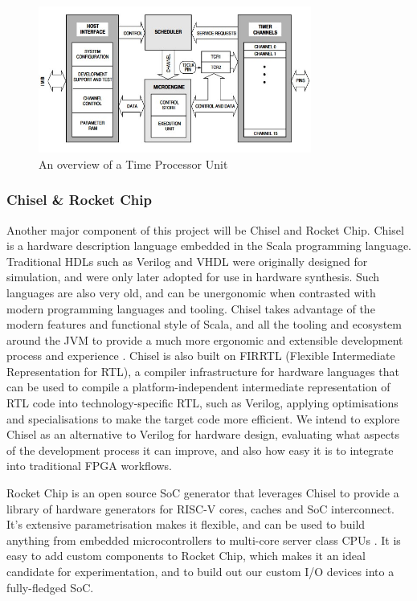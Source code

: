 \documentclass[a4paper,fleqn,12pt]{article}
\begin{document}
\begin{figure}[]
	\centering
	\includegraphics[width=0.8\textwidth]{../img/tpu.jpg}
	\caption{An overview of a Time Processor Unit \citep{tpu}}
	\label{fig:tpu}
\end{figure}

\subsubsection{Chisel \& Rocket Chip}

Another major component of this project will be Chisel and Rocket Chip. Chisel is a hardware description language embedded in the Scala programming language. Traditional HDLs such as Verilog and VHDL were originally designed for simulation, and were only later adopted for use in hardware synthesis. Such languages are also very old, and can be unergonomic when contrasted with modern programming languages and tooling. Chisel takes advantage of the modern features and functional style of Scala, and all the tooling and ecosystem around the JVM to provide a much more ergonomic and extensible development process and experience \citep{chisel}. Chisel is also built on FIRRTL (Flexible Intermediate Representation for RTL), a compiler infrastructure for hardware languages that can be used to compile a platform-independent intermediate representation of RTL code into technology-specific RTL, such as Verilog, applying optimisations and specialisations to make the target code more efficient\citep{firrtl}. We intend to explore Chisel as an alternative to Verilog for hardware design, evaluating what aspects of the development process it can improve, and also how easy it is to integrate into traditional FPGA workflows.

Rocket Chip is an open source SoC generator that leverages Chisel to provide a library of hardware generators for RISC-V cores, caches and SoC interconnect. It's extensive parametrisation makes it flexible, and can be used to build anything from embedded microcontrollers to multi-core server class CPUs \citep{rocketchip}. It is easy to add custom components to Rocket Chip, which makes it an ideal candidate for experimentation, and to build out our custom I/O devices into a fully-fledged SoC.
\end{document}
